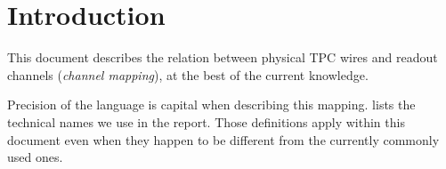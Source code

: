 \section{Introduction}
\label{sec:intro}

This document describes the relation between physical TPC wires and readout
channels (\emph{channel mapping}), at the best of the current knowledge.

Precision of the language is capital when describing this mapping.
 lists the technical names we use in the report.
Those definitions apply within this document even when they happen to be
different from the currently commonly used ones.

